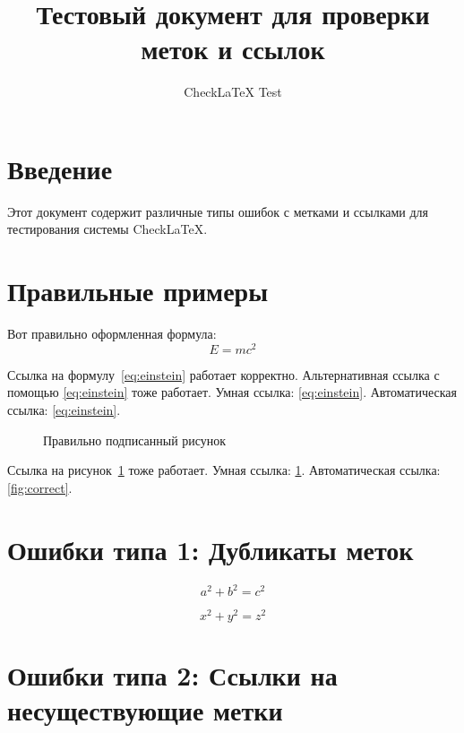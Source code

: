 \documentclass{article}
\title{Тестовый документ для проверки меток и ссылок}
\author{CheckLaTeX Test}
\begin{document}
\maketitle

\section{Введение}

Этот документ содержит различные типы ошибок с метками и ссылками для тестирования системы CheckLaTeX.

\section{Правильные примеры}

Вот правильно оформленная формула:
\begin{equation}
    E = mc^2
    \label{eq:einstein}
\end{equation}

Ссылка на формулу~\ref{eq:einstein} работает корректно.
Альтернативная ссылка с помощью \eqref{eq:einstein} тоже работает.
Умная ссылка: \cref{eq:einstein}.
Автоматическая ссылка: \autoref{eq:einstein}.

\begin{figure}[h]
    \centering 
    \caption{Правильно подписанный рисунок}
    \label{fig:correct}
\end{figure}

Ссылка на рисунок~\ref{fig:correct} тоже работает.
Умная ссылка: \cref{fig:correct}.
Автоматическая ссылка: \autoref{fig:correct}.

\section{Ошибки типа 1: Дубликаты меток}

\begin{equation}
    a^2 + b^2 = c^2
    \label{eq:duplicate}  %
\end{equation}

\begin{equation}
    x^2 + y^2 = z^2
    \label{eq:duplicate}  %
\end{equation}

\section{Ошибки типа 2: Ссылки на несуществующие метки}
\end{document}
